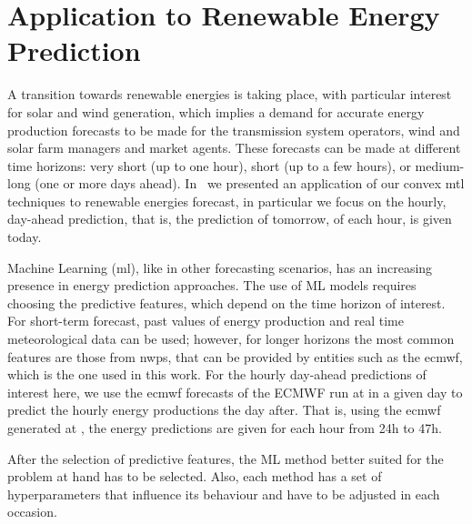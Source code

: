 \section{Application to Renewable Energy Prediction}\label{sec:convexmlt_renewable}

A transition towards renewable energies is taking place, with particular interest for solar and wind generation, which implies a demand for accurate energy production forecasts to be made for the transmission system operators, wind and solar farm managers and market agents. These forecasts can be made at different time horizons: very short (up to one hour), short (up to a few hours), or medium-long (one or more days ahead).
In~\citet{ruiz2020_energies} we presented an application of our convex \acrshort{mtl} techniques to renewable energies forecast, in particular we focus on the hourly, day-ahead prediction, that is, the prediction of tomorrow, of each hour, is given today.

Machine Learning (\acrshort{ml}), like in other forecasting scenarios, has an increasing presence in energy prediction approaches. 
The use of ML models requires choosing the predictive features, which depend on the time horizon of interest. 
For short-term forecast, past values of energy production and real time meteorological data can be used; however, for longer horizons the most common features are those from \acrfull{nwps}, that can be provided by entities such as the \acrfull{ecmwf}, which is the one used in this work.
For the hourly day-ahead predictions of interest here, we use the \acrshort{ecmwf} forecasts of the ECMWF run at  in a given day to predict the hourly energy productions the day after. That is, using the \acrshort{ecmwf} generated at , the energy predictions are given for each hour from {24}h to {47}h.

After the selection of predictive features, the ML method better suited for the problem at hand has to be selected. Also, each method has a set of hyperparameters that influence its behaviour and have to be adjusted in each occasion.


